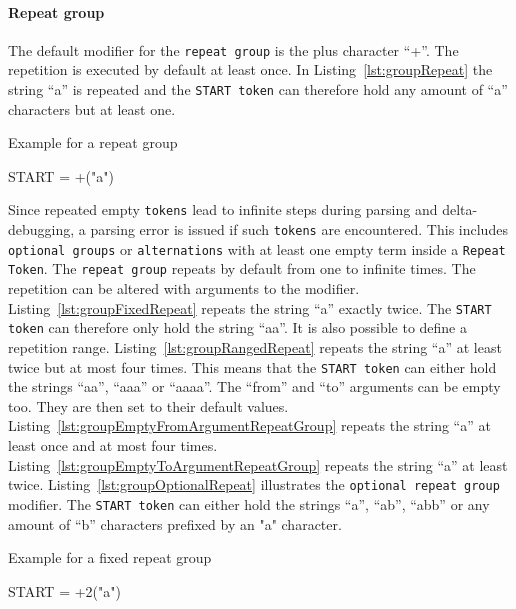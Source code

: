 \paragraph{Repeat group}
\label{par:groupRepeat}

The default modifier for the \texttt{repeat group} is the plus character \enquote{+}. The repetition is executed by default at least once. In Listing~\ref{lst:groupRepeat} the string \enquote{a} is repeated and the \texttt{START token} can therefore hold any amount of \enquote{a} characters but at least one.

\begin{listing}
\caption{Example for a repeat group}
\label{lst:groupRepeat}
\begin{gocode}
START = +("a")
\end{gocode}
\end{listing}

Since repeated empty \texttt{tokens} lead to infinite steps during parsing and delta-debugging, a parsing error is issued if such \texttt{tokens} are encountered. This includes \texttt{optional groups} or \texttt{alternations} with at least one empty term inside a \texttt{Repeat Token}. The \texttt{repeat group} repeats by default from one to infinite times. The repetition can be altered with arguments to the modifier. Listing~\ref{lst:groupFixedRepeat} repeats the string \enquote{a} exactly twice. The \texttt{START token} can therefore only hold the string \enquote{aa}. It is also possible to define a repetition range. Listing~\ref{lst:groupRangedRepeat} repeats the string \enquote{a} at least twice but at most four times. This means that the \texttt{START token} can either hold the strings \enquote{aa}, \enquote{aaa} or \enquote{aaaa}. The \enquote{from} and \enquote{to} arguments can be empty too. They are then set to their default values. Listing~\ref{lst:groupEmptyFromArgumentRepeatGroup} repeats the string \enquote{a} at least once and at most four times. Listing~\ref{lst:groupEmptyToArgumentRepeatGroup} repeats the string \enquote{a} at least twice. Listing~\ref{lst:groupOptionalRepeat} illustrates the \texttt{optional repeat group} modifier. The \texttt{START token} can either hold the strings \enquote{a}, \enquote{ab}, \enquote{abb} or any amount of \enquote{b} characters prefixed by an "a" character.

\begin{listing}
\caption{Example for a fixed repeat group}
\label{lst:groupFixedRepeat}
\begin{gocode}
START = +2("a")
\end{gocode}
\end{listing}

